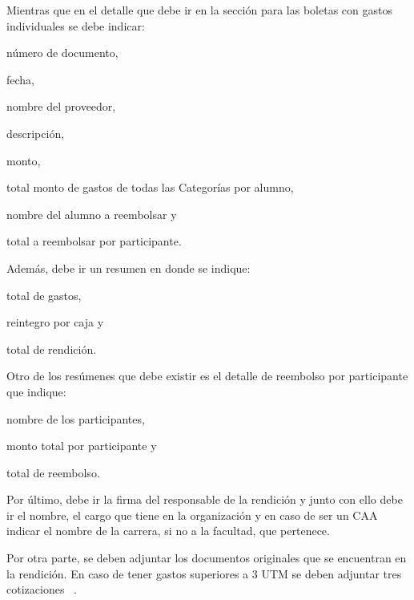   Mientras que en el detalle que debe ir en la sección para las boletas con gastos individuales se debe indicar:
  \begin{enumerate*}[label=(\roman*)]
    \item número de documento,
    \item fecha,
    \item nombre del proveedor,
    \item descripción,
    \item monto,
    \item total monto de gastos de todas las Categorías por alumno,
    \item nombre del alumno a reembolsar y
    \item total a reembolsar por participante.
  \end{enumerate*}
  
  Además, debe ir un resumen en donde se indique:
  \begin{enumerate*}[label=(\roman*)]
    \item total de gastos,
    \item reintegro por caja y
    \item total de rendición.
  \end{enumerate*}
  
  Otro de los resúmenes que debe existir es el detalle de reembolso por participante que indique:
  \begin{enumerate*}[label=(\roman*)]
    \item nombre de los participantes,
    \item monto total por participante y
    \item total de reembolso.
  \end{enumerate*}
  
  Por último, debe ir la firma del responsable de la rendición y junto con ello debe ir el nombre, el cargo que tiene en la organización y en caso de ser un CAA indicar el nombre de la carrera, si no a la facultad, que pertenece.
  
  Por otra parte, se deben adjuntar los documentos originales que se encuentran en la rendición. En caso de tener gastos superiores a 3 UTM se deben adjuntar tres cotizaciones ~\cite{5}.
  

  